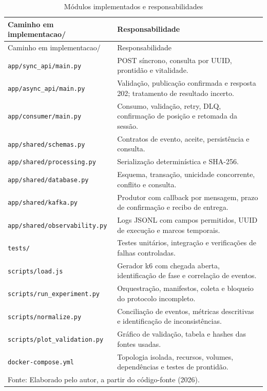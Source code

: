 {\small
\begin{longtable}{p{}p{}}
\caption{Módulos implementados e responsabilidades}\label{tab:modulos-implementados}\\
\hline Caminho em implementacao/ & Responsabilidade\\ \hline
\endfirsthead
\hline Caminho em implementacao/ & Responsabilidade\\ \hline
\endhead
\texttt{app/sync\_api/main.py} & POST síncrono, consulta por UUID, prontidão e vitalidade.\\ \hline
\texttt{app/async\_api/main.py} & Validação, publicação confirmada e resposta 202; tratamento de resultado incerto.\\ \hline
\texttt{app/consumer/main.py} & Consumo, validação, retry, DLQ, confirmação de posição e retomada da sessão.\\ \hline
\texttt{app/shared/schemas.py} & Contratos de evento, aceite, persistência e consulta.\\ \hline
\texttt{app/shared/processing.py} & Serialização determinística e SHA-256.\\ \hline
\texttt{app/shared/database.py} & Esquema, transação, unicidade concorrente, conflito e consulta.\\ \hline
\texttt{app/shared/kafka.py} & Produtor com callback por mensagem, prazo de confirmação e recibo de entrega.\\ \hline
\texttt{app/shared/observability.py} & Logs JSONL com campos permitidos, UUID de execução e marcos temporais.\\ \hline
\texttt{tests/} & Testes unitários, integração e verificações de falhas controladas.\\ \hline
\texttt{scripts/load.js} & Gerador k6 com chegada aberta, identificação de fase e correlação de eventos.\\ \hline
\texttt{scripts/run\_experiment.py} & Orquestração, manifestos, coleta e bloqueio do protocolo incompleto.\\ \hline
\texttt{scripts/normalize.py} & Conciliação de eventos, métricas descritivas e identificação de inconsistências.\\ \hline
\texttt{scripts/plot\_validation.py} & Gráfico de validação, tabela e hashes das fontes usadas.\\ \hline
\texttt{docker-compose.yml} & Topologia isolada, recursos, volumes, dependências e testes de prontidão.\\ \hline
\multicolumn{2}{l}{\footnotesize Fonte: Elaborado pelo autor, a partir do código-fonte (2026).}
\end{longtable}
}


